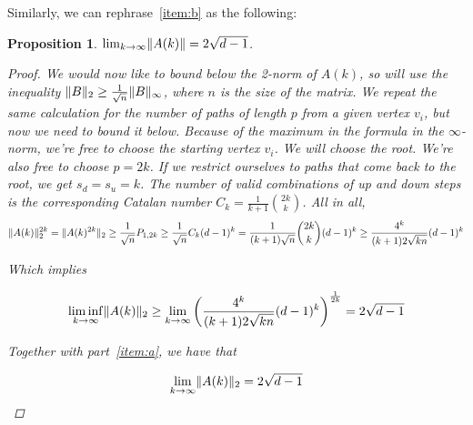 \documentclass{amsart}
\theoremstyle{plain}
\newtheorem*{proposition}{\textbf{Proposition}}
\theoremstyle{definition}
\DeclarePairedDelimiter{\norm}{\lVert}{\rVert}
\begin{document}
    Similarly, we can rephrase~\ref{item:b} as the following:
    \begin{proposition}
        $\lim_{k \to \infty} \norm{A(k)} = 2 \sqrt{d - 1}$.

        \begin{proof}
            We would now like to bound \emph{below} the 2-norm of $A(k)$, so will use the inequality
            $\norm{B}_2 \geq \frac{1}{\sqrt{n}} \norm{B}_\infty$, where $n$ is the size of the matrix.
            We repeat the same calculation for the number of paths of length $p$ from a given vertex $v_i$,
            but now we need to bound it below.
            Because of the maximum in the formula in the $\infty$-norm,
            we're free to choose the starting vertex $v_i$.
            We will choose the root.
            We're also free to choose $p = 2k$.
            If we restrict ourselves to paths that come back to the root, we get $s_d = s_u = k$.
            The number of valid combinations of \emph{up} and \emph{down} steps is
            the corresponding \emph{Catalan number} $C_k = \frac{1}{k+1} \binom{2k}{k}$.
            All in all,
            \begin{equation*}
                \norm{A(k)}_2^{2k} =
                \norm{A(k)^{2k}}_2\geq
                \frac{1}{\sqrt{n}} P_{1, 2k} \geq
                \frac{1}{\sqrt{n}} C_k (d-1)^k =
                \frac{1}{(k+1)\sqrt{n}} \binom{2k}{k} (d-1)^k \geq
                \frac{4^k}{(k+1)2\sqrt{kn}} (d-1)^k
            \end{equation*}

            Which implies

            \begin{equation*}
                \liminf_{k \to \infty} \norm{A(k)}_2 \geq
                \lim_{k \to \infty} \left( \frac{4^k}{(k+1)2\sqrt{kn}} (d-1)^k \right)^{\frac{1}{2k}}
                = 2 \sqrt{d-1}
            \end{equation*}

            Together with part~\ref{item:a}, we have that

            \begin{equation*}
                \lim_{k \to \infty} \norm{A(k)}_2 = 2 \sqrt{d-1}
            \end{equation*}

        \end{proof}
    \end{proposition}
\end{document}
